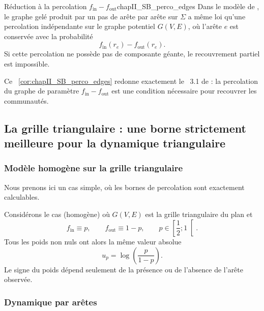 \begin{Corollaire}{Réduction à la percolation $f_{\mathrm{in}}-f_{\mathrm{out}}$}{chapII_SB_perco_edges}
Dans le modèle de \SB{}, le graphe gelé produit par un pas de \SW{} arête par arête sur $\Sigma$ a même loi qu'une percolation indépendante sur le graphe potentiel $G(V,E)$, où l'arête $e$ est conservée avec la probabilité
\begin{equation}
    f_{\mathrm{in}}(r_e)-f_{\mathrm{out}}(r_e).
    \label{eq:chapII_fin_fout}
\end{equation}
Si cette percolation ne possède pas de composante géante, le recouvrement partiel est impossible.
\end{Corollaire}

Ce \Cor~\ref{cor:chapII_SB_perco_edges} redonne exactement le \Th~3.1 de \SB{} \cite{SankararamanBaccelli2018} : la percolation du graphe de paramètre $f_{\mathrm{in}}-f_{\mathrm{out}}$ est une condition nécessaire pour recouvrer les communautés.

\subsection{La grille triangulaire : une borne strictement meilleure pour la dynamique triangulaire}
\label{sec:chapII_triangular_grid}

\subsubsection{Modèle homogène sur la grille triangulaire}

Nous prenons ici un cas simple, où les bornes de percolation sont exactement calculables.

Considérons le cas (homogène) où $G(V,E)$ est la grille triangulaire du plan et
\[
    f_{\mathrm{in}}\equiv p,
    \qquad
    f_{\mathrm{out}}\equiv 1-p,
    \qquad
    p\in\left[\frac12 ; 1\right[.
\]
Tous les poids non nuls ont alors la même valeur absolue
\begin{equation}
    u_p=\log\left(\frac{p}{1-p}\right).
    \label{eq:chapII_up}
\end{equation}
Le signe du poids dépend seulement de la présence ou de l'absence de l'arête observée.

\subsubsection{Dynamique par arêtes}

